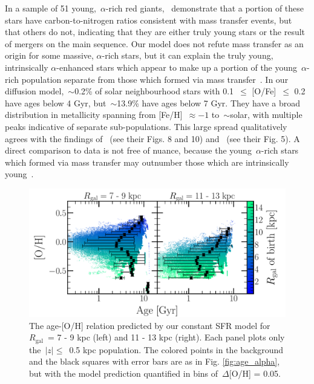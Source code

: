 \documentclass[draft2.tex]{subfiles}
\begin{document}
In a sample of 51 young,~$\alpha$-rich red giants,~\citet{Hekker2019} 
demonstrate that a portion of these stars have carbon-to-nitrogen ratios 
consistent with mass transfer events, but that others do not, indicating that 
they are either truly young stars or the result of mergers on the main 
sequence. 
{\color{red} 
Our model does not refute mass transfer as an origin for some massive, 
$\alpha$-rich stars, but it can explain the truly young, intrinsically 
$\alpha$-enhanced stars which appear to make up a portion of the 
young~$\alpha$-rich population separate from those which formed via mass 
transfer~\citep{Yong2016, Hekker2019}. 
}
In our diffusion model,~$\sim$0.2\% of solar neighbourhood stars with 0.1~$\leq$ 
[O/Fe]~$\leq$ 0.2 have ages below 4 Gyr, but~$\sim$13.9\% have ages below 7 Gyr. 
{\color{red} 
They have a broad distribution in metallicity spanning from [Fe/H]~$\approx-1$ 
to~$\sim$solar, with multiple peaks indicative of separate sub-populations. 
This large spread qualitatively agrees with the findings 
of~\citet{SilvaAguirre2018} (see their Figs. 8 and 10) and~\citet{Miglio2021} 
(see their Fig. 5). 
A direct comparison to data is not free of nuance, because the 
young~$\alpha$-rich stars which formed via mass transfer may outnumber 
those which are intrinsically young~\citep{Miglio2021}. 
} 

\begin{figure} 
\centering 
\includegraphics[scale = 0.35]{amr_static_o.pdf} 
\caption{The age-[O/H] relation predicted by our constant SFR model for 
$R_\text{gal}$~= 7 - 9 kpc (left) and 11 - 13 kpc (right). Each panel plots 
only the~$\left|z\right|\leq$~0.5 kpc population. The colored points in the 
background and the black squares with error bars are as in Fig. 
\ref{fig:age_alpha}, but with the model prediction quantified in bins 
of~$\Delta$[O/H] = 0.05. } 
\label{fig:age_oh_static} 
\end{figure} 
\end{document}
